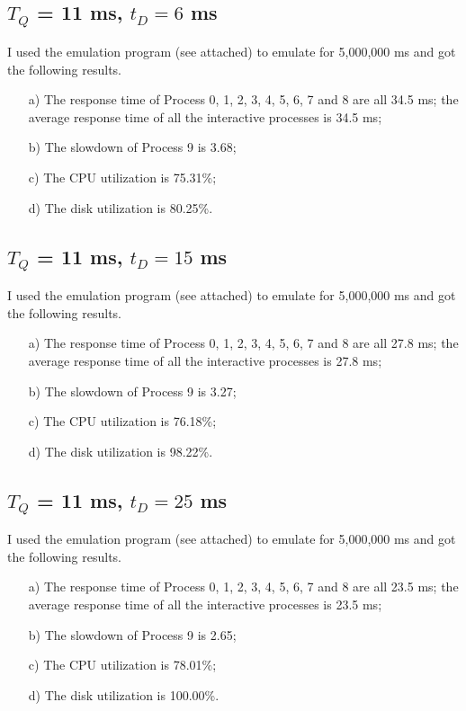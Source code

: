 \documentclass[12pt,letterpaper]{article}
\begin{document}
\subsection{$T_Q$ = 11 ms, $t_D=6$ ms}
I used the emulation program (see attached) to emulate for 5,000,000 ms and got the following results.
\begin{enumerate}
\item[a)] The response time of Process 0, 1, 2, 3, 4, 5, 6, 7 and 8 are all 34.5 ms; the average response time of all the interactive processes is 34.5 ms;
\item[b)] The slowdown of Process 9 is 3.68;
\item[c)] The CPU utilization is 75.31\%;
\item[d)] The disk utilization is 80.25\%.
\end{enumerate}

\subsection{$T_Q$ = 11 ms, $t_D=15$ ms}
I used the emulation program (see attached) to emulate for 5,000,000 ms and got the following results.
\begin{enumerate}
\item[a)] The response time of Process 0, 1, 2, 3, 4, 5, 6, 7 and 8 are all 27.8 ms; the average response time of all the interactive processes is 27.8 ms;
\item[b)] The slowdown of Process 9 is 3.27;
\item[c)] The CPU utilization is 76.18\%;
\item[d)] The disk utilization is 98.22\%.
\end{enumerate}

\subsection{$T_Q$ = 11 ms, $t_D=25$ ms}
I used the emulation program (see attached) to emulate for 5,000,000 ms and got the following results.
\begin{enumerate}
\item[a)] The response time of Process 0, 1, 2, 3, 4, 5, 6, 7 and 8 are all 23.5 ms; the average response time of all the interactive processes is 23.5 ms;
\item[b)] The slowdown of Process 9 is 2.65;
\item[c)] The CPU utilization is 78.01\%;
\item[d)] The disk utilization is 100.00\%.
\end{enumerate}
\end{document}
